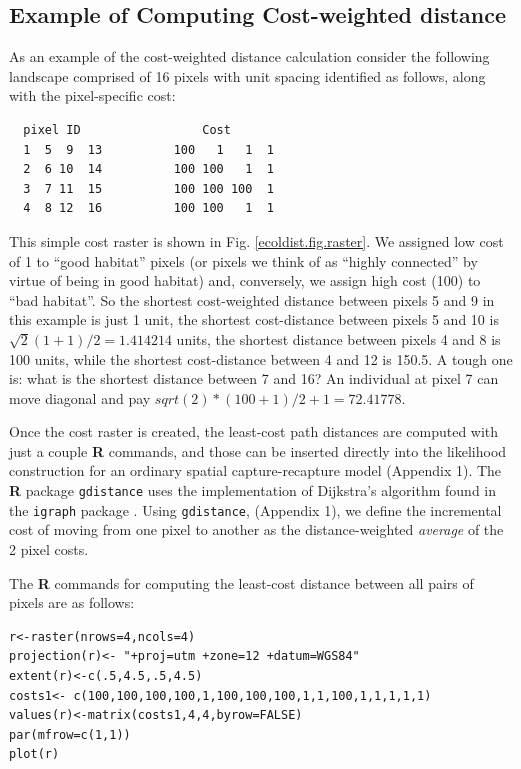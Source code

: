 \subsection{Example of Computing Cost-weighted distance}

As an example of the cost-weighted distance calculation consider the
following landscape comprised of 16 pixels with unit spacing
identified as follows, along with the pixel-specific cost:
\begin{center}
\begin{verbatim}
  pixel ID                 Cost
  1  5  9  13          100   1   1  1
  2  6 10  14          100 100   1  1
  3  7 11  15          100 100 100  1
  4  8 12  16          100 100   1  1
\end{verbatim}
\end{center}
This simple cost
raster is shown in Fig. \ref{ecoldist.fig.raster}.
We assigned low cost of 1 to ``good habitat'' pixels (or pixels
we think of as ``highly connected'' by virtue of being in good
habitat) and, conversely, we assign high cost (100) to ``bad
habitat''. So the shortest cost-weighted distance between pixels 5 and
9 in this example is just 1 unit, the shortest cost-distance between
pixels 5 and 10 is $\sqrt{2}(1+1)/2 = 1.414214$ units, the shortest
distance between pixels 4 and 8 is 100 units, while the shortest
cost-distance between 4 and 12 is 150.5. A tough one is: what is the
shortest distance between 7 and 16? An individual at pixel 7 can move
diagonal and pay $sqrt(2)*(100+1)/2 + 1 =72.41778$.  


Once the cost raster is created, the least-cost path distances are
computed with just a couple {\bf R} commands, and those can be
inserted directly into the likelihood construction for an ordinary
spatial capture-recapture model (Appendix 1). The {\bf R} package
\mbox{\tt gdistance} uses the implementation of Dijkstra's algorithm
\citep{dijkstra:1959} found in the \mbox{\tt igraph} package
\citep{csardi:2010}.  Using \mbox{\tt gdistance}, (Appendix 1), we
define the incremental cost of moving from one pixel to another as the
distance-weighted {\it average} of the 2 pixel costs.

The {\bf R} commands for computing the least-cost distance between all pairs of pixels 
are as follows:
\begin{verbatim}
r<-raster(nrows=4,ncols=4)
projection(r)<- "+proj=utm +zone=12 +datum=WGS84"
extent(r)<-c(.5,4.5,.5,4.5)
costs1<- c(100,100,100,100,1,100,100,100,1,1,100,1,1,1,1,1)
values(r)<-matrix(costs1,4,4,byrow=FALSE)
par(mfrow=c(1,1))
plot(r)
\end{verbatim}


